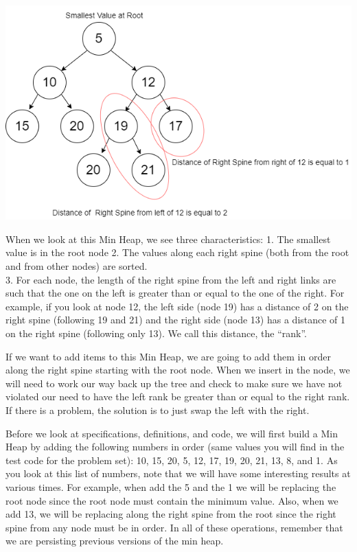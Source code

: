 \documentclass[
]{book}
\begin{document}
\includegraphics{images/heap_example.drawio.png}

When we look at this Min Heap, we see three characteristics:
1. The smallest value is in the root node
2. The values along each right spine (both from the root and from other nodes) are sorted.\\
3. For each node, the length of the right spine from the left and right links are such that the one on the left is greater than or equal to the one of the right. For example, if you look at node 12, the left side (node 19) has a distance of 2 on the right spine (following 19 and 21) and the right side (node 13) has a distance of 1 on the right spine (following only 13). We call this distance, the ``rank''.

If we want to add items to this Min Heap, we are going to add them in order along the right spine starting with the root node. When we insert in the node, we will need to work our way back up the tree and check to make sure we have not violated our need to have the left rank be greater than or equal to the right rank. If there is a problem, the solution is to just swap the left with the right.

Before we look at specifications, definitions, and code, we will first build a Min Heap by adding the following numbers in order (same values you will find in the test code for the problem set): 10, 15, 20, 5, 12, 17, 19, 20, 21, 13, 8, and 1. As you look at this list of numbers, note that we will have some interesting results at various times. For example, when add the 5 and the 1 we will be replacing the root node since the root node must contain the minimum value. Also, when we add 13, we will be replacing along the right spine from the root since the right spine from any node must be in order. In all of these operations, remember that we are persisting previous versions of the min heap.
\end{document}
